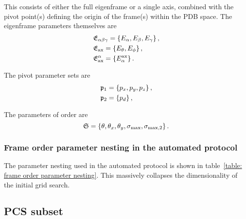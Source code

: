 
This consists of either the full eigenframe or a single axis, combined with the pivot point(s) defining the origin of the frame(s) within the PDB space.
The eigenframe parameters themselves are
\begin{subequations}
\begin{align}
    &\mathfrak{E}_{\alpha\beta\gamma} = \left\{ E_\alpha, E_\beta, E_\gamma \right\}, \\
    &\mathfrak{E}_\textrm{ax} = \left\{ E_\theta, E_\phi \right\}, \\
    &\mathfrak{E}^\alpha_\textrm{ax} = \left\{ E_\alpha^{\textrm{ax}} \right\}.
\end{align}
\end{subequations}

The pivot parameter sets are
\begin{subequations}
\begin{align}
    &\mathfrak{p}_1 = \left\{ p_x, p_y, p_z \right\}, \\
    &\mathfrak{p}_2 = \left\{ p_d \right\},
\end{align}
\end{subequations}



The parameters of order are
\begin{equation}
    \mathfrak{S} = \left\{ \theta, \theta_x, \theta_y, \sigma_\textrm{max}, \sigma_{\textrm{max,2}} \right\}.
\end{equation}


\subsubsection{Frame order parameter nesting in the automated protocol}



The parameter nesting used in the automated protocol is shown in table~\ref{table: frame order parameter nesting}.
This massively collapses the dimensionality of the initial grid search.





\subsection{PCS subset}

